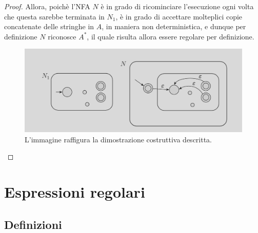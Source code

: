 \documentclass[a4paper, 12pt]{report}
\begin{document}
\begin{proof}
        Allora, poichè l'NFA $N$ è in grado di ricominciare l'esecuzione ogni volta che questa sarebbe terminata in $N_1$, è in grado di accettare molteplici copie concatenate delle stringhe in $A$, in maniera non deterministica, e dunque per definizione $N$ riconosce $A^*$, il quale risulta allora essere regolare per definizione.

        \begin{figure}[H]
            \centering
            \includegraphics[scale=0.35]{../assets/star-neg.png}
            \caption{L'immagine raffigura la dimostrazione costruttiva descritta.}
        \end{figure}
    \end{proof}

    \section{Espressioni regolari}

    \subsection{Definizioni}
\end{document}
